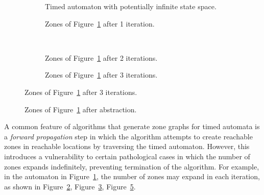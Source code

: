 \documentclass[a4paper]{llncs}
\begin{document}
\begin{figure}
  \centering
  \caption{Timed automaton with a potentially infinite
    set of zones, example taken from \cite{Behrmann03staticguard}.}
  \label{breaking2withzones}
  \begin{subfigure}[b]{0.5\textwidth}
    \centering
    \def\svgwidth{\columnwidth}
    
    \caption{Timed automaton with potentially infinite state space.}
    \label{breaking2}
  \end{subfigure}%

  \begin{subfigure}[b]{0.3\textwidth}
    \centering
    \def\svgwidth{\columnwidth}
    
    \caption{Zones of Figure~\ref{breaking2} after 1 iteration.}
    \label{breaking2-zones01}
  \end{subfigure}
  ~ %
  \begin{subfigure}[b]{0.6\textwidth}
    \centering
    \def\svgwidth{\columnwidth}
    
    \caption{Zones of Figure~\ref{breaking2} after 2 iterations.}
    \label{breaking2-zones02}
  \end{subfigure}

  \begin{subfigure}[b]{\textwidth}
    \centering
    \def\svgwidth{0.9\columnwidth}
    
    \caption{Zones of Figure~\ref{breaking2} after 3 iterations.}
    \label{breaking2-zones03}
  \end{subfigure}
\end{figure}

\begin{figure}
  \centering
  \def\svgwidth{0.9\columnwidth}
  
  \caption{Zones of Figure~\ref{breaking2} after abstraction.}
\end{figure}

A common feature of algorithms that generate zone graphs for timed
automata is a \emph{forward propagation} step in which the algorithm attempts to
create reachable zones in reachable locations by traversing the timed
automaton. However, this introduces a vulnerability to certain
pathological cases in which the number of zones expands indefinitely,
preventing termination of the algorithm. For example, in the automaton in
Figure~\ref{breaking2}, the number of zones may expand in each
iteration, as shown in Figure~\ref{breaking2-zones01},
Figure~\ref{breaking2-zones02}, Figure~\ref{breaking2-zones03}.
\end{document}
